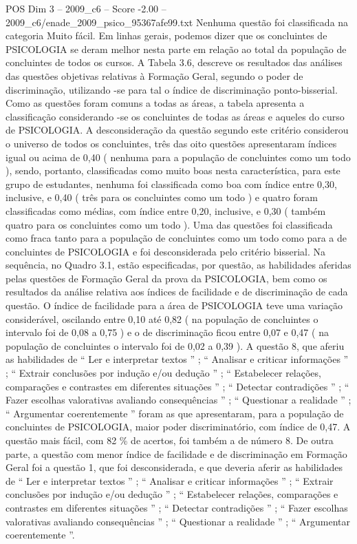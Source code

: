 \begin{textsample}{POS Dim 3 – 2009\_c6 – Score -2.00 – 2009\_c6/enade\_2009\_psico\_95367afe99.txt}
Nenhuma questão foi classificada na categoria Muito fácil.
Em linhas gerais, podemos dizer que os concluintes de PSICOLOGIA se deram melhor nesta parte em relação ao total da população de concluintes de todos os cursos.
A Tabela 3.6, descreve os resultados das análises das questões objetivas relativas à Formação Geral, segundo o poder de discriminação, utilizando -se para tal o índice de discriminação ponto-bisserial.
Como as questões foram comuns a todas as áreas, a tabela apresenta a classificação considerando -se os concluintes de todas as áreas e aqueles do curso de PSICOLOGIA.
A desconsideração da questão segundo este critério considerou o universo de todos os concluintes, três das oito questões apresentaram índices igual ou acima de 0,40 ( nenhuma para a população de concluintes como um todo ), sendo, portanto, classificadas como muito boas nesta característica, para este grupo de estudantes, nenhuma foi classificada como boa com índice entre 0,30, inclusive, e 0,40 ( três para os concluintes como um todo ) e quatro foram classificadas como médias, com índice entre 0,20, inclusive, e 0,30 ( também quatro para os concluintes como um todo ).
Uma das questões foi classificada como fraca tanto para a população de concluintes como um todo como para a de concluintes de PSICOLOGIA e foi desconsiderada pelo critério bisserial.
Na sequência, no Quadro 3.1, estão especificadas, por questão, as habilidades aferidas pelas questões de Formação Geral da prova da PSICOLOGIA, bem como os resultados da análise relativa aos índices de facilidade e de discriminação de cada questão.
O índice de facilidade para a área de PSICOLOGIA teve uma variação considerável, oscilando entre 0,10 até 0,82 ( na população de concluintes o intervalo foi de 0,08 a 0,75 ) e o de discriminação ficou entre 0,07 e 0,47 ( na população de concluintes o intervalo foi de 0,02 a 0,39 ).
A questão 8, que aferiu as habilidades de “ Ler e interpretar textos ” ; “ Analisar e criticar informações ” ; “ Extrair conclusões por indução e/ou dedução ” ; “ Estabelecer relações, comparações e contrastes em diferentes situações ” ; “ Detectar contradições ” ; “ Fazer escolhas valorativas avaliando consequências ” ; “ Questionar a realidade ” ; “ Argumentar coerentemente ” foram as que apresentaram, para a população de concluintes de PSICOLOGIA, maior poder discriminatório, com índice de 0,47.
A questão mais fácil, com 82 \% de acertos, foi também a de número 8.
De outra parte, a questão com menor índice de facilidade e de discriminação em Formação Geral foi a questão 1, que foi desconsiderada, e que deveria aferir as habilidades de “ Ler e interpretar textos ” ; “ Analisar e criticar informações ” ; “ Extrair conclusões por indução e/ou dedução ” ; “ Estabelecer relações, comparações e contrastes em diferentes situações ” ; “ Detectar contradições ” ; “ Fazer escolhas valorativas avaliando consequências ” ; “ Questionar a realidade ” ; “ Argumentar coerentemente ”.

\end{textsample}
